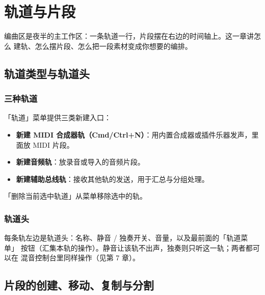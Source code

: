 
\chapter{轨道与片段}
\label{ch:tracks-clips}






编曲区是夜半的主工作区：一条轨道一行，片段摆在右边的时间轴上。这一章讲怎么
建轨、怎么摆片段、怎么把一段素材变成你想要的编排。

\section{轨道类型与轨道头}

\subsection{三种轨道}

「轨道」菜单提供三类新建入口：

\begin{itemize}
  \item \textbf{新建 MIDI 合成器轨（Cmd/Ctrl+N）}：用内置合成器或插件乐器发声，里面放 MIDI 片段。
  \item \textbf{新建音频轨}：放录音或导入的音频片段。
  \item \textbf{新建辅助总线轨}：接收其他轨的发送，用于汇总与分组处理。
\end{itemize}

「删除当前选中轨道」从菜单移除选中的轨。

\subsection{轨道头}

每条轨左边是轨道头：名称、静音 / 独奏开关、音量，以及最前面的「轨道菜单」
按钮（汇集本轨的操作）。静音让该轨不出声，独奏则只听这一轨；两者都可以在
混音控制台里同样操作（见第 7 章）。


\section{片段的创建、移动、复制与分割}

